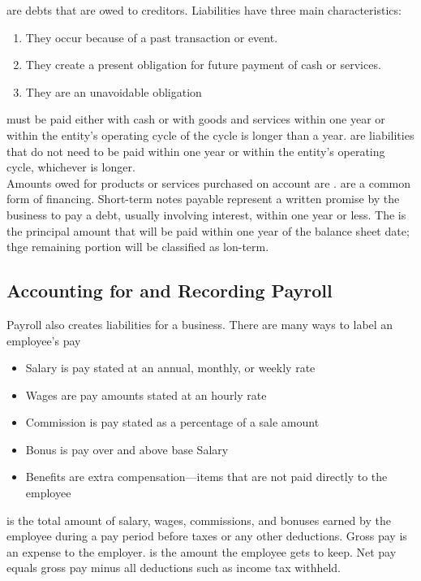 \documentclass{article}
\begin{document}
 are debts that are owed to creditors. Liabilities have three main characteristics:
\begin{enumerate}
  \item They occur because of a past transaction or event. 
  \item They create a present obligation for future payment of cash or services. 
  \item They are an unavoidable obligation
\end{enumerate}
 must be paid either with cash or with goods and services within one year or within the entity's operating cycle of the cycle is longer than a year.  are liabilities that do not need to be paid within one year or within the entity's operating cycle, whichever is longer. \\ 

Amounts owed for products or services purchased on account are .  are a common form of financing. Short-term notes payable represent a written promise by the business to pay a debt, usually involving interest, within one year or less. The  is the principal amount that will be paid within one year of the balance sheet date; thge remaining portion will be classified as lon-term. 

\subsection{Accounting for and Recording Payroll}

Payroll also creates liabilities for a business. There are many ways to label an employee's pay
\begin{itemize}
  \item Salary is pay stated at an annual, monthly, or weekly rate 
  \item Wages are pay amounts stated at an hourly rate 
  \item Commission is pay stated as a percentage of a sale amount 
  \item Bonus is pay over and above base Salary 
  \item Benefits are extra compensation---items that are not paid directly to the employee
\end{itemize}
 is the total amount of salary, wages, commissions, and bonuses earned by the employee during a pay period before taxes or any other deductions. Gross pay is an expense to the employer.  is the amount the employee gets to keep. Net pay equals gross pay minus all deductions such as income tax withheld. \\ 
\end{document}
